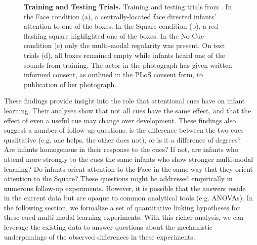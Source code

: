 \documentclass[12pt]{article}
\begin{document}
\begin{figure}[!h]
\caption{\textbf{Training and Testing Trials.} Training and testing trials from \cite{Wu2010a}. In the Face condition (a), a centrally-located face directed infants' attention to one of the boxes. In the Square condition (b), a red flashing square highlighted one of the boxes. In the No Cue condition (c) only the multi-modal regularity was present. On test trials (d), all boxes remained empty while infants heard one of the sounds from training. The actor in the photograph has given written informed consent, as outlined in the PLoS consent form, to publication of her photograph.}
\label{fig:conds}
\end{figure}
	
	These findings provide insight into the role that attentional cues have on infant learning. Their analyses show that not all cues have the same effect, and that the effect of even a useful cue may change over development. These findings also suggest a number of follow-up questions: is the difference between the two cues qualitative (e.g. one helps, the other does not), or is it a difference of degrees? Are infants homogenous in their response to the cues? If not, are infants who attend more strongly to the cues the same infants who show stronger multi-modal learning? Do infants orient attention to the Face in the same way that they orient attention to the Square? These questions might be addressed empirically in numerous follow-up experiments. However, it is possible that the answers reside in the current data but are opaque to common analytical tools (e.g. ANOVAs). In the following section, we formalize a set of quantitative linking hypotheses for these cued multi-modal learning experiments. With this richer analysis, we can leverage the existing data to answer questions about the mechanistic underpinnings of the observed differences in these experiments.
\end{document}
